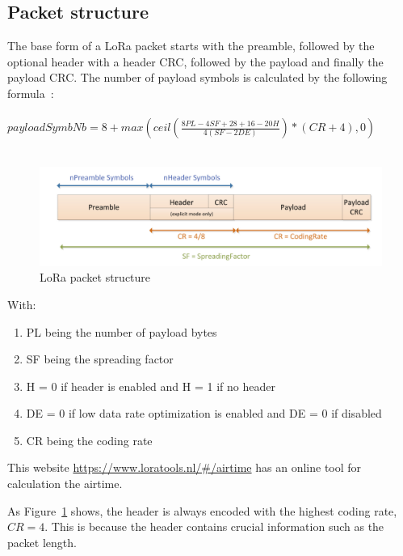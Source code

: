 \subsection{Packet structure}
The base form of a LoRa packet starts with the preamble, followed by the optional header with a header CRC, followed by the payload and finally the 
payload CRC. The number of payload symbols is calculated by the following formula~\cite{SX_design_guide}:\\ \\
$payloadSymbNb = 8 + max{(ceil(\frac{8PL-4SF+28+16-20H}{4(SF-2DE)})*(CR+4),0)}$ 
\\ \\

\begin{figure}[h]
    \centering
    \includegraphics[width=1\textwidth]{figures/packet_struct.png}
    \caption{LoRa packet structure~\cite{SX_design_guide}}
    \label{fig:packet_struct}
\end{figure}

With: 
\begin{enumerate}
    \item PL being the number of payload bytes
    \item SF being the spreading factor
    \item H = 0 if header is enabled and H = 1 if no header
    \item DE = 0 if low data rate optimization is enabled and DE = 0 if disabled
    \item CR being the coding rate
    
\end{enumerate}

This website \url{https://www.loratools.nl/#/airtime} has an online tool for calculation the airtime.

As Figure~\ref{fig:packet_struct} shows, the header is always encoded with the highest coding rate, $CR=4$.
This is because the header contains crucial information such as the packet length.


